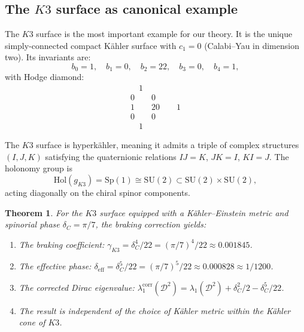 \documentclass[12pt,a4paper]{article}
\newtheorem{theorem}{Theorem}[section]
\theoremstyle{definition}
\theoremstyle{remark}
\newcommand{\Sp}{\mathrm{Sp}}
\newcommand{\cD}{\mathcal{D}}
\newcommand{\SU}{\mathrm{SU}}
\newcommand{\Hol}{\mathrm{Hol}}
\begin{document}
\subsection{The $K3$ surface as canonical example}

The $K3$ surface is the most important example for our theory. It is the unique simply-connected compact K\"ahler surface with $c_1 = 0$ (Calabi--Yau in dimension two). Its invariants are:
\begin{equation}
b_0 = 1, \quad b_1 = 0, \quad b_2 = 22, \quad b_3 = 0, \quad b_4 = 1,
\end{equation}
with Hodge diamond:
\begin{equation}
\begin{array}{c}
\quad 1 \quad \\
0 \quad\quad 0 \\
1 \quad\quad 20 \quad\quad 1 \\
0 \quad\quad 0 \\
\quad 1 \quad
\end{array}
\end{equation}

The $K3$ surface is hyperk\"ahler, meaning it admits a triple of complex structures $(I, J, K)$ satisfying the quaternionic relations $IJ = K$, $JK = I$, $KI = J$. The holonomy group is
\begin{equation}
\Hol(g_{K3}) = \Sp(1) \cong \SU(2) \subset \SU(2) \times \SU(2),
\end{equation}
acting diagonally on the chiral spinor components.

\begin{theorem}
\label{thm:k3-braking}
For the $K3$ surface equipped with a K\"ahler--Einstein metric and spinorial phase $\delta_C = \pi/7$, the braking correction yields:
\begin{enumerate}[label=(\roman*)]
\item The braking coefficient: $\gamma_{K3} = \delta_C^4/22 = (\pi/7)^4/22 \approx 0.001845$.
\item The effective phase: $\delta_{\mathrm{eff}} = \delta_C^5/22 = (\pi/7)^5/22 \approx 0.000828 \approx 1/1200$.
\item The corrected Dirac eigenvalue: $\lambda_1^{\mathrm{corr}}(\cD^2) = \lambda_1(\cD^2) + \delta_C^2/2 - \delta_C^5/22$.
\item The result is independent of the choice of K\"ahler metric within the K\"ahler cone of $K3$.
\end{enumerate}
\end{theorem}
\end{document}

